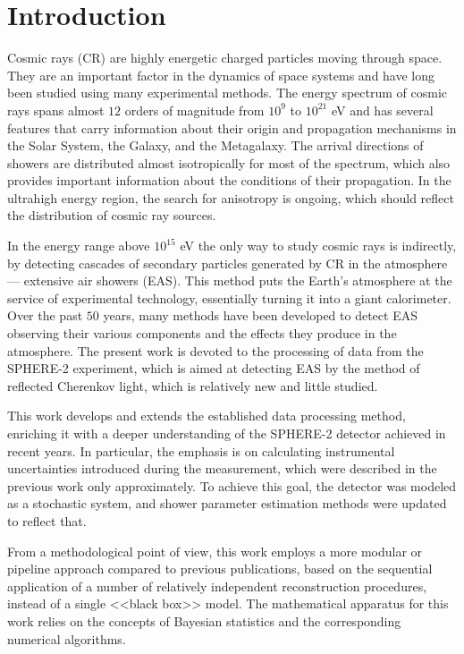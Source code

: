 \chapter*{Introduction}

Cosmic rays (CR) are highly energetic charged particles moving through space. They are an important factor in the dynamics of space systems and have long been studied using many experimental methods. The energy spectrum of cosmic rays spans almost $12$ orders of magnitude from $10^{9}$ to $10^{21}$ eV and has several features that carry information about their origin and propagation mechanisms in the Solar System, the Galaxy, and the Metagalaxy. The arrival directions of showers are distributed almost isotropically for most of the spectrum, which also provides important information about the conditions of their propagation. In the ultrahigh energy region, the search for anisotropy is ongoing, which should reflect the distribution of cosmic ray sources.

In the energy range above $10^{15}$ eV the only way to study cosmic rays is indirectly, by detecting cascades of secondary particles generated by CR in the atmosphere --- extensive air showers (EAS). This method puts the Earth's atmosphere at the service of experimental technology, essentially turning it into a giant calorimeter. Over the past $50$ years, many methods have been developed to detect EAS observing their various components and the effects they produce in the atmosphere. The present work is devoted to the processing of data from the SPHERE-2 experiment, which is aimed at detecting EAS by the method of reflected Cherenkov light, which is relatively new and little studied.

This work develops and extends the established data processing method, enriching it with a deeper understanding of the SPHERE-2 detector achieved in recent years. In particular, the emphasis is on calculating instrumental uncertainties introduced during the measurement, which were described in the previous work only approximately. To achieve this goal, the detector was modeled as a stochastic system, and shower parameter estimation methods were updated to reflect that.

From a methodological point of view, this work employs a more modular or pipeline approach compared to previous publications, based on the sequential application of a number of relatively independent reconstruction procedures, instead of a single <<black box>> model. The mathematical apparatus for this work relies on the concepts of Bayesian statistics and the corresponding numerical algorithms.
